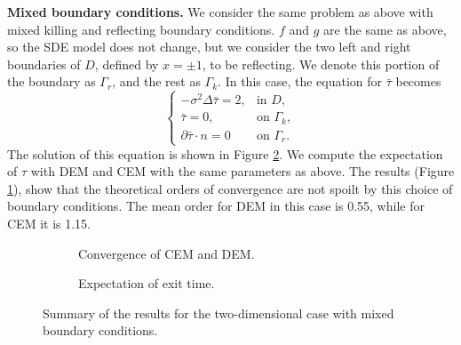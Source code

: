 \noindent\textbf{Mixed boundary conditions.} We consider the same problem as above with mixed killing and reflecting boundary conditions. $f$ and $g$ are the same as above, so the SDE model does not change, but we consider the two left and right boundaries of $D$, defined by $x = \pm 1$, to be reflecting. We denote this portion of the boundary as $\Gamma_r$, and the rest as $\Gamma_k$. In this case, the equation for $\bar\tau$ becomes
\begin{equation}\label{eq:PDETau2DKilling}
\begin{cases}
	- \sigma^2 \Delta \bar \tau = 2, & \text{in } D, \\
	\bar \tau = 0, & \text{on } \Gamma_k, \\
	\partial \bar \tau \cdot n = 0 & \text{on } \Gamma_r.
\end{cases}
\end{equation}
The solution of this equation is shown in Figure \ref{fig:TauExact2DRefl}. We compute the expectation of $\tau$ with DEM and CEM with the same parameters as above. The results (Figure \ref{fig:ReflTwoD}), show that the theoretical orders of convergence are not spoilt by this choice of boundary conditions. The mean order for DEM in this case is 0.55, while for CEM it is 1.15.


\begin{figure}[t]
    \centering
    \begin{subfigure}{0.49\linewidth}
        \centering
        \resizebox{1\linewidth}{!}{ }  
        \caption{Convergence of CEM and DEM.}
        \label{fig:ReflTwoD}
    \end{subfigure}
    \begin{subfigure}{0.49\linewidth}
        \centering
        \resizebox{1\linewidth}{!}{ }  
        \caption{Expectation of exit time.}
        \label{fig:TauExact2DRefl}
    \end{subfigure}    
    \caption{Summary of the results for the two-dimensional case with mixed boundary conditions.}
    \label{fig:OrdersTwoDRefl}
\end{figure}
